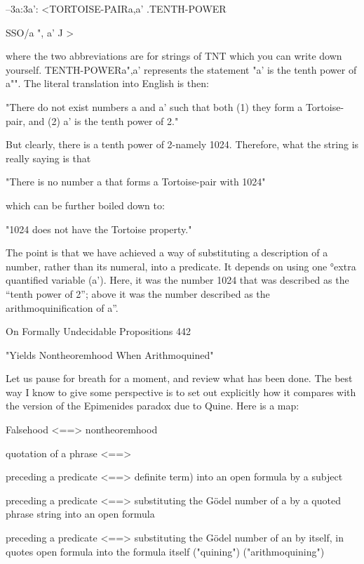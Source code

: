         --3a:3a': <TORTOISE-PAIR{a,a' }.TENTH-POWER{SSO/a ", a' J >

where the two abbreviations are for strings of TNT which you can write down yourself.
TENTH-POWER{a",a'} represents the statement "a' is the tenth power of a"". The
literal translation into English is then:

   "There do not exist numbers a and a' such that both (1) they form a Tortoise-pair,
   and (2) a' is the tenth power of 2."

But clearly, there is a tenth power of 2-namely 1024. Therefore, what the string is really
saying is that

        "There is no number a that forms a Tortoise-pair with 1024"

which can be further boiled down to:

                       "1024 does not have the Tortoise property."

The point is that we have achieved a way of substituting a description of a number, rather
than its numeral, into a predicate. It depends on using one °extra quantified variable (a').
Here, it was the number 1024 that was described as the “tenth power of 2”; above it was
the number described as the arithmoquinification of a”.




On Formally Undecidable Propositions                                                     442

                  "Yields Nontheoremhood When Arithmoquined"

Let us pause for breath for a moment, and review what has been done. The best way I
know to give some perspective is to set out explicitly how it compares with the version of
the Epimenides paradox due to Quine. Here is a map:

             Falsehood                  <==>                 nontheoremhood

       quotation of a phrase            <==>

       preceding a predicate            <==>        definite term) into an open formula
           by a subject

       preceding a predicate            <==>        substituting the Gödel number of a
        by a quoted phrase                             string into an open formula

       preceding a predicate            <==>       substituting the Gödel number of an
        by itself, in quotes                       open formula into the formula itself
            ("quining")                                     ("arithmoquining")

}
